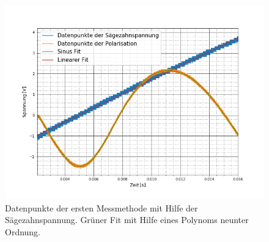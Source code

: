 \begin{figure}[ht]
	\includegraphics[scale=0.5]{Bild/V1_15}
	\centering
	\caption[Plot zu Versuchsteil 1 Nr.15]{Datenpunkte der ersten Messmethode mit Hilfe der Sägezahnspannung. Grüner Fit mit Hilfe eines Polynoms neunter Ordnung.}
\end{figure}